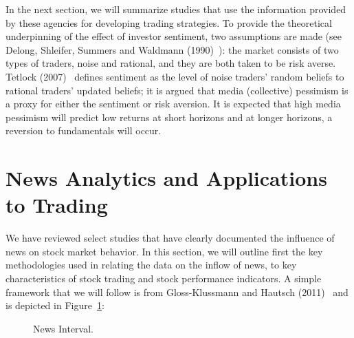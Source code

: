 In the next section, we will summarize studies that use the information provided by these agencies for developing trading strategies. To provide the theoretical underpinning of the effect of investor sentiment, two assumptions are made (see Delong, Shleifer, Summers and Waldmann (1990)~\cite{ssw}): the market consists of two types of traders, noise and rational, and they are both taken to be risk averse. Tetlock (2007)~\cite{tetlock2007giving} defines sentiment as the level of noise traders' random beliefs to rational traders' updated beliefs; it is argued that media (collective) pessimism is a proxy for either the sentiment or risk aversion. It is expected that high media pessimism will predict low returns at short horizons and at longer horizons, a reversion to fundamentals will occur. 



\section{News Analytics and Applications to Trading}

We have reviewed select studies that have clearly documented the influence of news on stock market behavior. In this section, we will outline first the key methodologies used in relating the data on the inflow of news, to key characteristics of stock trading and stock performance indicators. A simple framework that we will follow is from Gloss-Klussmann and Hautsch (2011)~\cite{klub} and is depicted in Figure~\ref{fig:intervals}:
	
	\begin{figure}[!ht]
	\centering
	\caption{News Interval.\label{fig:intervals}}
	\end{figure}

